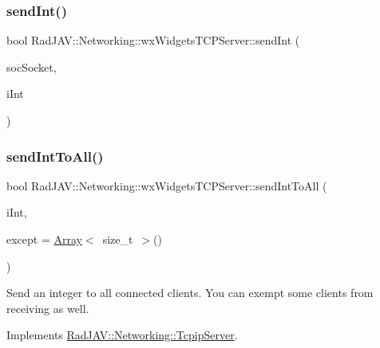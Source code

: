 \subsubsection{\texorpdfstring{send\+Int()}{sendInt()}}
{\footnotesize\ttfamily bool Rad\+J\+A\+V\+::\+Networking\+::wx\+Widgets\+T\+C\+P\+Server\+::send\+Int (\begin{DoxyParamCaption}\item[{wx\+Socket\+Base $\ast$}]{soc\+Socket,  }\item[{int}]{i\+Int }\end{DoxyParamCaption})}

\mbox{\label{class_rad_j_a_v_1_1_networking_1_1wx_widgets_t_c_p_server_aabb486086e700bbc52729d91b4500d0c}} 
\subsubsection{\texorpdfstring{send\+Int\+To\+All()}{sendIntToAll()}}
{\footnotesize\ttfamily bool Rad\+J\+A\+V\+::\+Networking\+::wx\+Widgets\+T\+C\+P\+Server\+::send\+Int\+To\+All (\begin{DoxyParamCaption}\item[{int}]{i\+Int,  }\item[{\mbox{\hyperlink{class_rad_j_a_v_1_1_array}{Array}}$<$ size\+\_\+t $>$}]{except = {\ttfamily \mbox{\hyperlink{class_rad_j_a_v_1_1_array}{Array}}$<$~size\+\_\+t~$>$()} }\end{DoxyParamCaption})\hspace{0.3cm}{\ttfamily [virtual]}}

Send an integer to all connected clients. You can exempt some clients from receiving as well. 

Implements \mbox{\hyperlink{class_rad_j_a_v_1_1_networking_1_1_tcpip_server_afaa133f1ac712598f54c5eb3f248e163}{Rad\+J\+A\+V\+::\+Networking\+::\+Tcpip\+Server}}.

\mbox{\label{class_rad_j_a_v_1_1_networking_1_1wx_widgets_t_c_p_server_a82159c7ca10a3e5267936e8c02c8fbbc}} 
